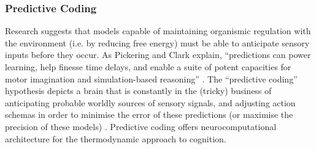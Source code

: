 \begin{CJK}{UTF8}{gbsn}




\subsubsection{Predictive Coding}
Research suggests that models capable of maintaining organismic regulation with the environment (i.e. by reducing free energy) must be able to anticipate sensory inputs before they occur. As Pickering and Clark explain, ``predictions can power learning, help finesse time delays, and enable a suite of potent capacities for motor imagination and simulation-based reasoning'' \citep[6]{Pickering2014}.  The ``predictive coding'' hypothesis depicts a brain that is constantly in the (tricky) business of anticipating probable worldly sources of sensory signals, and adjusting action schemas in order to minimise the error of these predictions (or maximise the precision of these models) \citep{Friston2010,Clark2013}. Predictive coding offers neurocomputational architecture for the thermodynamic approach to cognition.


\end{CJK}
